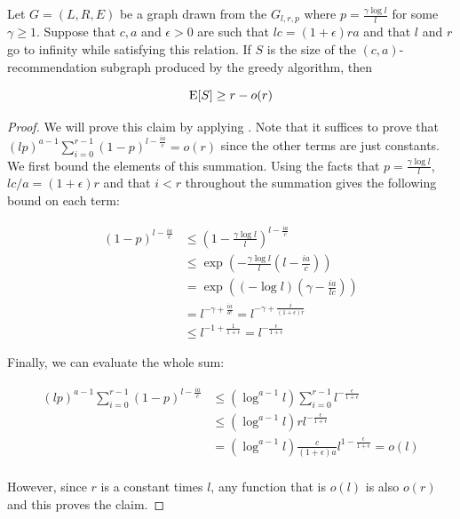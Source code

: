 \begin{thm}
Let $G=(L,R,E)$ be a graph drawn from the $G_{l,r,p}$ where $p = \frac{\gamma \log l}{l}$ for some $\gamma \geq 1$. Suppose that $c, a$ and $\epsilon>0$ are such that $lc=(1+\epsilon)ra$ and that $l$ and $r$ go to infinity while satisfying this relation. If $S$ is the size of the $(c,a)$-recommendation subgraph produced by the greedy algorithm, then

\[ \text{E}[S] \geq r - o(r) \]
\end{thm}
\begin{proof}
We will prove this claim by applying \cite{greedy-is-good}. Note that it suffices to prove that $(lp)^{a-1}\sum_{i=0}^{r-1}(1-p)^{l-\frac{ia}{c}} = o(r)$ since the other terms are just constants. We first bound the elements of this summation. Using the facts that $p = \frac{\gamma \log l}{l}$, $lc/a = (1+\epsilon)r$ and that $i<r$ throughout the summation gives the following bound on each term:

\begin{align*}
       (1-p)^{l-\frac{ia}{c}} 
&\leq  \left(1-\frac{\gamma \log l}{l}\right)^{l-\frac{ia}{c}} \\
&\leq  \exp\left(-\frac{\gamma \log l}{l}\left(l-\frac{ia}{c}\right)\right) \\ 
&=     \exp\left((-\log l)\left(\gamma - \frac{ia}{lc}\right)\right) \\
&=     l^{-\gamma+\frac{ia}{lc}} = l^{-\gamma+\frac{i}{(1+\epsilon)r}} \\
&\leq  l^{-1+\frac{1}{1+\epsilon}} = l^{-\frac{\epsilon}{1+\epsilon}}
\end{align*}

Finally, we can evaluate the whole sum:

\begin{align*}
       (lp)^{a-1}  \sum_{i=0}^{r-1}(1-p)^{l-\frac{ia}{c}}
&\leq  \left(\log^{a-1}l\right) \sum_{i=0}^{r-1}l^{-\frac{\epsilon}{1+\epsilon}}\\
&\leq  \left(\log^{a-1}l\right) rl^{-\frac{\epsilon}{1+\epsilon}}\\
&=     \left(\log^{a-1}l\right) \frac{c}{(1+\epsilon)a}l^{1-\frac{\epsilon}{1+\epsilon}} = o(l)\\
\end{align*}

However, since $r$ is a constant times $l$, any function that is $o(l)$ is also $o(r)$ and this proves the claim.

\end{proof}









